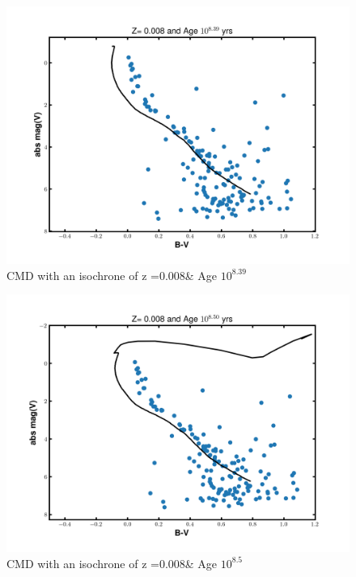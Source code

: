 \documentclass[12pt]{article}
\begin{document}
    
    \begin{figure}[H]
    \centering
    \includegraphics[width=\textwidth]{fig/iso_z008_839.png}
    \caption{CMD with an isochrone of z =0.008\& Age $10^{8.39}$}
    \end{figure}

    \begin{figure}[H]
    \centering
    \includegraphics[width=\textwidth]{fig/iso_z008_850.png}
    \caption{CMD with an isochrone of z =0.008\& Age $10^{8.5}$}
    \end{figure}
    
\end{document}

